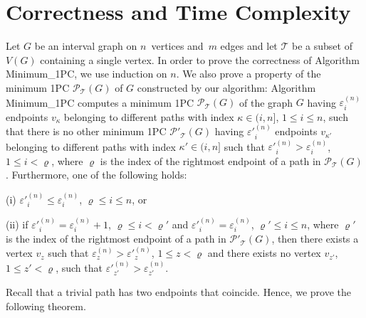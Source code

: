 \documentclass[10pt]{article}
\begin{document}
{\section{Correctness and Time Complexity}

Let $G$ be an interval graph on $n$~vertices and~$m$ edges and let
$\mathcal{T}$ be a subset of $V(G)$ containing a single vertex. In
order to prove the correctness of Algorithm Minimum\_1PC, we use
induction on $n$. We also prove a property of the minimum 1PC
$\mathcal{P}_\mathcal{T}(G)$ of $G$ constructed by our algorithm:
Algorithm Minimum\_1PC computes a minimum 1PC
$\mathcal{P_{\mathcal{T}}}(G)$ of the graph $G$ having
$\varepsilon^{(n)}_i$ endpoints $v_\kappa$ belonging to different
paths with index $\kappa \in (i,n]$, $1 \leq i \leq n$, such that
there is no other minimum 1PC $\mathcal{P'_{\mathcal{T}}}(G)$
having $\varepsilon'^{(n)}_i$ endpoints $v_{\kappa'}$ belonging to
different paths with index $\kappa' \in (i,n]$ such that
$\varepsilon'^{(n)}_i>\varepsilon^{(n)}_i$, $1 \leq i < \varrho$,
where $\varrho$ is the index of the rightmost endpoint of a path
in $\mathcal{P_{\mathcal{T}}}(G)$. Furthermore, one of the
following holds:

\noindent (i) $\varepsilon'^{(n)}_i \leq \varepsilon^{(n)}_i$,
$\varrho \leq i \leq n$, or

\noindent (ii) if $\varepsilon'^{(n)}_i = \varepsilon^{(n)}_i +1$,
$\varrho \leq i < \varrho'$ and $\varepsilon'^{(n)}_i =
\varepsilon^{(n)}_i$, $\varrho' \leq i \leq n$, where $\varrho'$
is the index of the rightmost endpoint of a path in
$\mathcal{P'_{\mathcal{T}}}(G)$, then there exists a vertex $v_z$
such that $\varepsilon^{(n)}_z > \varepsilon'^{(n)}_z$, $1 \leq z
< \varrho$ and there exists no vertex $v_{z'}$, $1 \leq z'
<\varrho$, such that
$\varepsilon'^{(n)}_{z'}>\varepsilon^{(n)}_{z'}$.

\noindent Recall that a trivial path has two endpoints that
coincide. Hence, we prove the following theorem.

}
\end{document}
